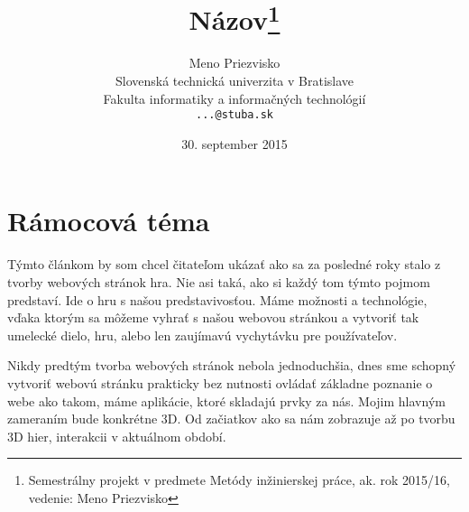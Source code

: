 \documentclass[10pt,twoside,slovak,a4paper]{article}
\title{Názov\thanks{Semestrálny projekt v predmete Metódy inžinierskej práce, ak. rok 2015/16, vedenie: Meno Priezvisko}} %
\author{Meno Priezvisko\\[2pt]
	{\small Slovenská technická univerzita v Bratislave}\\
	{\small Fakulta informatiky a informačných technológií}\\
	{\small \texttt{...@stuba.sk}}
	}
\date{\small 30. september 2015} %
\begin{document}
\maketitle

\section{Rámocová téma}

Týmto článkom by som chcel čitateľom ukázať ako sa za posledné roky stalo z tvorby webových stránok hra. Nie asi taká, ako si každý tom týmto pojmom predstaví. Ide o hru s našou predstavivosťou. Máme možnosti a technológie, vďaka ktorým sa môžeme vyhrať s našou webovou stránkou a vytvoriť tak umelecké dielo, hru, alebo len zaujímavú vychytávku pre používateľov.

Nikdy predtým tvorba webových stránok nebola jednoduchšia, dnes sme schopný vytvoriť webovú stránku prakticky bez nutnosti ovládať základne poznanie o webe ako takom, máme aplikácie, ktoré skladajú prvky za nás. Mojim hlavným zameraním bude konkrétne 3D. Od začiatkov ako sa nám zobrazuje až po tvorbu 3D hier, interakcii v aktuálnom období.

\cite{Kang:FODA}


\end{document}
